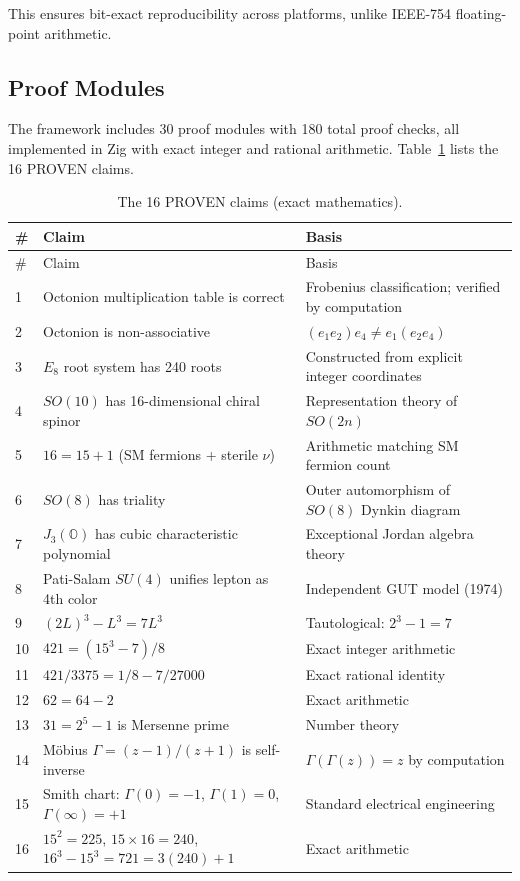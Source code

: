 \documentclass[11pt]{article}
\begin{document}
This ensures bit-exact reproducibility across platforms, unlike IEEE-754 floating-point arithmetic.

\subsection{Proof Modules}

The framework includes 30 proof modules with 180 total proof checks, all implemented in Zig with exact integer and rational arithmetic. Table~\ref{tab:proven} lists the 16 PROVEN claims.

\begin{longtable}{p{0.5cm} p{6cm} p{7cm}}
\caption{The 16 PROVEN claims (exact mathematics).} \label{tab:proven} \\
\toprule
\# & Claim & Basis \\
\midrule
\endfirsthead
\toprule
\# & Claim & Basis \\
\midrule
\endhead
1 & Octonion multiplication table is correct & Frobenius classification; verified by computation \\
2 & Octonion is non-associative & $(e_1 e_2) e_4 \neq e_1 (e_2 e_4)$ \\
3 & $E_8$ root system has 240 roots & Constructed from explicit integer coordinates \\
4 & $SO(10)$ has 16-dimensional chiral spinor & Representation theory of $SO(2n)$ \\
5 & $16 = 15 + 1$ (SM fermions + sterile $\nu$) & Arithmetic matching SM fermion count \\
6 & $SO(8)$ has triality & Outer automorphism of $SO(8)$ Dynkin diagram \\
7 & $J_3(\mathbb{O})$ has cubic characteristic polynomial & Exceptional Jordan algebra theory \\
8 & Pati-Salam $SU(4)$ unifies lepton as 4th color & Independent GUT model (1974) \\
9 & $(2L)^3 - L^3 = 7L^3$ & Tautological: $2^3 - 1 = 7$ \\
10 & $421 = (15^3 - 7)/8$ & Exact integer arithmetic \\
11 & $421/3375 = 1/8 - 7/27000$ & Exact rational identity \\
12 & $62 = 64 - 2$ & Exact arithmetic \\
13 & $31 = 2^5 - 1$ is Mersenne prime & Number theory \\
14 & M\"obius $\Gamma = (z-1)/(z+1)$ is self-inverse & $\Gamma(\Gamma(z)) = z$ by computation \\
15 & Smith chart: $\Gamma(0) = -1$, $\Gamma(1) = 0$, $\Gamma(\infty) = +1$ & Standard electrical engineering \\
16 & $15^2 = 225$, $15 \times 16 = 240$, $16^3 - 15^3 = 721 = 3(240)+1$ & Exact arithmetic \\
\bottomrule
\end{longtable}
\end{document}
